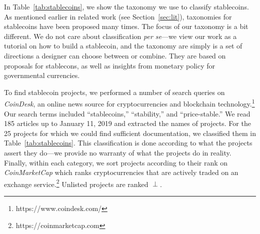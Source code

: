 

In Table~\ref{tab:stablecoins}, we show the taxonomy we use to classify stablecoins. As mentioned earlier in related work (see Section~\ref{sec:lit}), taxonomies for stablecoins have been proposed many times. The focus of our taxonomy is a bit different. We do not care about classification \textit{per se}---we view our work as a tutorial on how to build a stablecoin, and the taxonomy are simply is a set of directions a designer can choose between or combine. They are based on proposals for stablecons, as well as insights from monetary policy for governmental currencies.

To find stablecoin projects, we performed a number of search queries on \textit{CoinDesk}, an online news source for cryptocurrencies and blockchain technology.\footnote{https://www.coindesk.com/} Our search terms included ``stablecoins,'' ``stability,'' and ``price-stable.'' We read 185 articles up to January 11, 2019 and extracted the names of projects. For the 25 projects for which we could find sufficient documentation, we classified them in Table~\ref{tab:stablecoins}. This classification is done according to what the projects assert they do---we provide no warranty of what the projects do in reality. Finally, within each category, we sort projects according to their rank on \textit{CoinMarketCap} which ranks cryptocurrencies that are actively traded on an exchange service.\footnote{https://coinmarketcap.com} Unlisted projects are ranked $\perp$.


